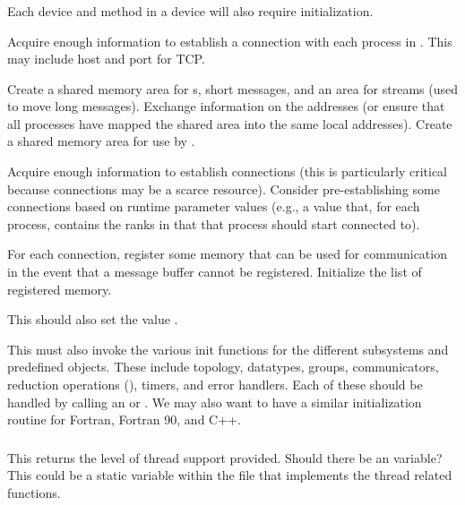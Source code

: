 \documentclass{article}
\begin{document}
\subsubsection{}
\begin{adi3}
Each device and method in a device will also require initialization.  
\begin{tcp}
Acquire enough information to establish a connection with each process
in .  This may include host and port for
TCP.  
\end{tcp}
\begin{shmem}
Create a shared memory area for s, short
messages, and an area for streams (used to move long messages).
Exchange information on the addresses (or ensure that all 
processes have mapped the shared area into the same local addresses).
Create a shared memory area for use by .
\end{shmem}
\begin{via}
Acquire enough information to establish connections (this is
particularly critical because connections may be a scarce resource).  
Consider pre-establishing some connections based on runtime parameter
values (e.g., a  value that, for each
process, contains the ranks in  that that
process should start connected to).  

For each connection, register some memory that can be used for
communication in the event that a message buffer cannot be registered.
Initialize the list of registered memory.
\end{via}
\end{adi3}
This should also set the value .

This must also invoke the various init functions for the different
subsystems and predefined objects.  These include topology, datatypes,
groups, communicators, reduction operations (), timers, and error
handlers.  Each of these should be handled by calling an
 or .  We may also
want to have a similar initialization routine for Fortran, Fortran 90,
and C++.  


\subsubsection{}
This returns the level of thread support provided.  Should there be an
 variable?  This could be a static
variable within the file that implements the thread related functions.
\end{document}
